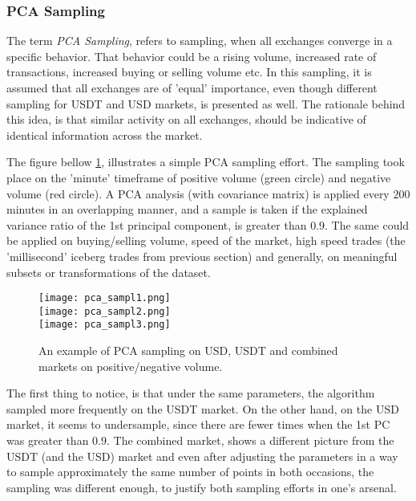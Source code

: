 \subsubsection{PCA Sampling}

The term \textit{PCA Sampling}, refers to sampling, when all exchanges converge in a specific behavior. That behavior could be a rising volume, increased rate of transactions, increased buying or selling volume etc. In this sampling, it is assumed that all exchanges are of 'equal' importance, even though different sampling for USDT and USD markets, is presented as well. The rationale behind this idea, is that similar activity on all exchanges, should be indicative of identical information across the market.

The figure bellow \ref{fig:pca_sampl1}, illustrates a simple PCA sampling effort. The sampling took place on the 'minute' timeframe of positive volume (green circle) and negative volume (red circle). A PCA analysis (with covariance matrix) is applied every \(200\) minutes in an overlapping manner, and a sample is taken if the explained variance ratio of the 1st principal component, is greater than \(0.9\). The same could be applied on buying/selling volume, speed of the market, high speed trades (the 'millisecond' iceberg trades from previous section) and generally, on meaningful subsets or transformations of the dataset.

 
\begin{figure}[H]
	\centering
    \texttt{[image: pca\_sampl1.png]} \\
    \texttt{[image: pca\_sampl2.png]} \\
    \texttt{[image: pca\_sampl3.png]}
	\caption{An example of PCA sampling on USD, USDT and combined markets on positive/negative volume.}
    \label{fig:pca_sampl1}
\end{figure}

The first thing to notice, is that under the same parameters, the algorithm sampled more frequently on the USDT market. On the other hand, on the USD market, it seems to undersample, since there are fewer times when the 1st PC was greater than \(0.9\). The combined market, shows a different picture from the USDT (and the USD) market and even after adjusting the parameters in a way to sample approximately the same number of points in both occasions, the sampling was different enough, to justify both sampling efforts in one's arsenal.

